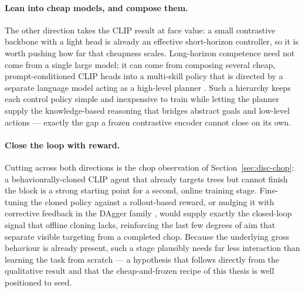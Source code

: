 \paragraph{Lean into cheap models, and compose them.} The other direction takes
the CLIP result at face value: a small contrastive backbone with a light head is
already an effective short-horizon controller, so it is worth pushing how far that
cheapness scales. Long-horizon competence need not come from a single large model;
it can come from composing several cheap, prompt-conditioned CLIP heads into a
multi-skill policy that is directed by a separate language model acting as a
high-level planner \cite{lifshitz2023steve1, fan2022minedojo, lynch2021langlfp}.
Such a hierarchy keeps each control policy simple and inexpensive to train while
letting the planner supply the knowledge-based reasoning that bridges abstract
goals and low-level actions --- exactly the gap a frozen contrastive encoder
cannot close on its own.

\paragraph{Close the loop with reward.} Cutting across both directions is the
chop observation of Section~\ref{sec:disc-chop}: a behaviourally-cloned CLIP agent
that already targets trees but cannot finish the block is a strong starting point
for a second, online training stage. Fine-tuning the cloned policy against a
rollout-based reward, or nudging it with corrective feedback in the
DAgger family \cite{ross2011}, would supply exactly the closed-loop signal that
offline cloning lacks, reinforcing the last few degrees of aim that separate
visible targeting from a completed chop. Because the underlying gross behaviour is
already present, such a stage plausibly needs far less interaction than learning
the task from scratch --- a hypothesis that follows directly from the qualitative
result and that the cheap-and-frozen recipe of this thesis is well positioned to
seed.
